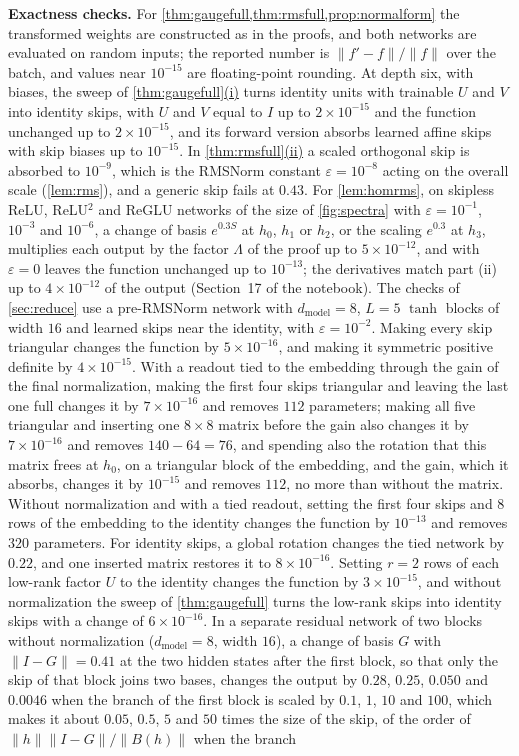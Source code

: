 \documentclass[10pt]{article}
\theoremstyle{definition}
\theoremstyle{remark}
\newcommand{\dm}{d_{\mathrm{model}}}
\newcommand{\norm}[1]{\lVert #1\rVert}
\newcommand{\para}[1]{\smallskip\noindent\textbf{#1}\hspace{0.5em}}
\DeclareRobustCommand{\cpref}[2]{\hyperref[#1:#2]{\cref*{#1}(#2)}}
\begin{document}
\para{Exactness checks.} For \cref{thm:gaugefull,thm:rmsfull,prop:normalform} the transformed weights are constructed as in the proofs, and both networks are evaluated on random inputs; the reported number is $\norm{f' - f}/\norm{f}$ over the batch, and values near $10^{-15}$ are floating-point rounding. At depth six, with biases, the sweep of \cpref{thm:gaugefull}{i} turns identity units with trainable $U$ and $V$ into identity skips, with $U$ and $V$ equal to $I$ up to $2\times10^{-15}$ and the function unchanged up to $2\times10^{-15}$, and its forward version absorbs learned affine skips with skip biases up to $10^{-15}$. In \cpref{thm:rmsfull}{ii} a scaled orthogonal skip is absorbed to $10^{-9}$, which is the RMSNorm constant $\varepsilon = 10^{-8}$ acting on the overall scale (\cref{lem:rms}), and a generic skip fails at $0.43$. For \cref{lem:homrms}, on skipless ReLU, ReLU$^2$ and ReGLU networks of the size of \cref{fig:spectra} with $\varepsilon = 10^{-1}$, $10^{-3}$ and $10^{-6}$, a change of basis $e^{0.3S}$ at $h_0$, $h_1$ or $h_2$, or the scaling $e^{0.3}$ at $h_3$, multiplies each output by the factor $\Lambda$ of the proof up to $5\times10^{-12}$, and with $\varepsilon = 0$ leaves the function unchanged up to $10^{-13}$; the derivatives match part (ii) up to $4\times10^{-12}$ of the output (Section~17 of the notebook). The checks of \cref{sec:reduce} use a pre-RMSNorm network with $\dm = 8$, $L = 5$ $\tanh$ blocks of width $16$ and learned skips near the identity, with $\varepsilon = 10^{-2}$. Making every skip triangular changes the function by $5\times10^{-16}$, and making it symmetric positive definite by $4\times10^{-15}$. With a readout tied to the embedding through the gain of the final normalization, making the first four skips triangular and leaving the last one full changes it by $7\times10^{-16}$ and removes $112$ parameters; making all five triangular and inserting one $8 \times 8$ matrix before the gain also changes it by $7\times10^{-16}$ and removes $140 - 64 = 76$, and spending also the rotation that this matrix frees at $h_0$, on a triangular block of the embedding, and the gain, which it absorbs, changes it by $10^{-15}$ and removes $112$, no more than without the matrix. Without normalization and with a tied readout, setting the first four skips and $8$ rows of the embedding to the identity changes the function by $10^{-13}$ and removes $320$ parameters. For identity skips, a global rotation changes the tied network by $0.22$, and one inserted matrix restores it to $8\times10^{-16}$. Setting $r = 2$ rows of each low-rank factor $U$ to the identity changes the function by $3\times10^{-15}$, and without normalization the sweep of \cref{thm:gaugefull} turns the low-rank skips into identity skips with a change of $6\times10^{-16}$. In a separate residual network of two blocks without normalization ($\dm = 8$, width $16$), a change of basis $G$ with $\norm{I - G} = 0.41$ at the two hidden states after the first block, so that only the skip of that block joins two bases, changes the output by $0.28$, $0.25$, $0.050$ and $0.0046$ when the branch of the first block is scaled by $0.1$, $1$, $10$ and $100$, which makes it about $0.05$, $0.5$, $5$ and $50$ times the size of the skip, of the order of $\norm{h}\norm{I - G}/\norm{B(h)}$ when the branch 
\end{document}
